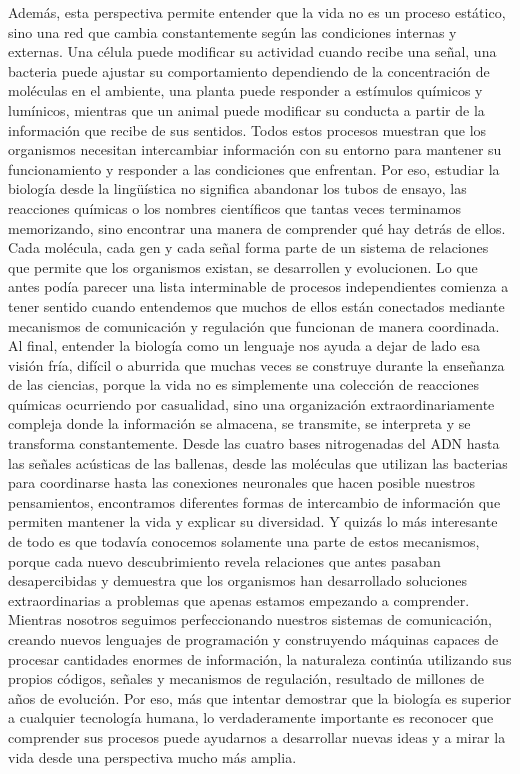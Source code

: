 \documentclass[12pt]{article}
\begin{document}
Además, esta perspectiva permite entender que la vida no es un proceso estático, sino una red que cambia constantemente según las condiciones internas y externas. Una célula puede modificar su actividad cuando recibe una señal, una bacteria puede ajustar su comportamiento dependiendo de la concentración de moléculas en el ambiente, una planta puede responder a estímulos químicos y lumínicos, mientras que un animal puede modificar su conducta a partir de la información que recibe de sus sentidos. Todos estos procesos muestran que los organismos necesitan intercambiar información con su entorno para mantener su funcionamiento y responder a las condiciones que enfrentan.
Por eso, estudiar la biología desde la lingüística no significa abandonar los tubos de ensayo, las reacciones químicas o los nombres científicos que tantas veces terminamos memorizando, sino encontrar una manera de comprender qué hay detrás de ellos. Cada molécula, cada gen y cada señal forma parte de un sistema de relaciones que permite que los organismos existan, se desarrollen y evolucionen. Lo que antes podía parecer una lista interminable de procesos independientes comienza a tener sentido cuando entendemos que muchos de ellos están conectados mediante mecanismos de comunicación y regulación que funcionan de manera coordinada.
Al final, entender la biología como un lenguaje nos ayuda a dejar de lado esa visión fría, difícil o aburrida que muchas veces se construye durante la enseñanza de las ciencias, porque la vida no es simplemente una colección de reacciones químicas ocurriendo por casualidad, sino una organización extraordinariamente compleja donde la información se almacena, se transmite, se interpreta y se transforma constantemente. Desde las cuatro bases nitrogenadas del ADN hasta las señales acústicas de las ballenas, desde las moléculas que utilizan las bacterias para coordinarse hasta las conexiones neuronales que hacen posible nuestros pensamientos, encontramos diferentes formas de intercambio de información que permiten mantener la vida y explicar su diversidad.
Y quizás lo más interesante de todo es que todavía conocemos solamente una parte de estos mecanismos, porque cada nuevo descubrimiento revela relaciones que antes pasaban desapercibidas y demuestra que los organismos han desarrollado soluciones extraordinarias a problemas que apenas estamos empezando a comprender. Mientras nosotros seguimos perfeccionando nuestros sistemas de comunicación, creando nuevos lenguajes de programación y construyendo máquinas capaces de procesar cantidades enormes de información, la naturaleza continúa utilizando sus propios códigos, señales y mecanismos de regulación, resultado de millones de años de evolución. Por eso, más que intentar demostrar que la biología es superior a cualquier tecnología humana, lo verdaderamente importante es reconocer que comprender sus procesos puede ayudarnos a desarrollar nuevas ideas y a mirar la vida desde una perspectiva mucho más amplia.
\end{document}
